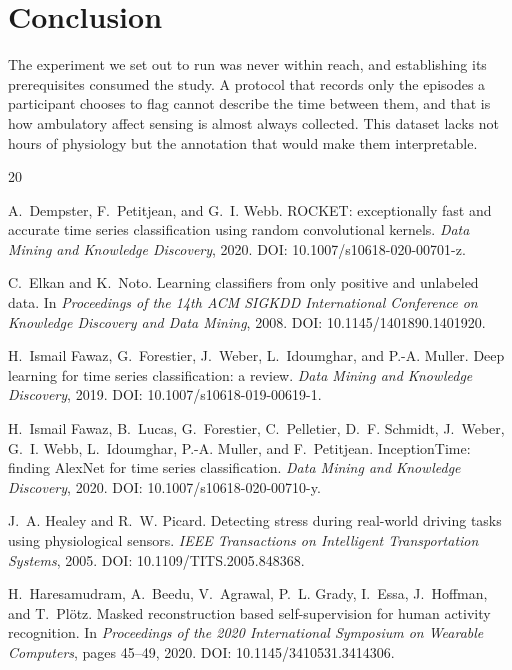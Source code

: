 \documentclass{article}
\begin{document}
\section{Conclusion}

The experiment we set out to run was never within reach, and establishing its
prerequisites consumed the study. A protocol that records only the episodes a
participant chooses to flag cannot describe the time between them, and that is
how ambulatory affect sensing is almost always collected. This dataset lacks not hours
of physiology but the annotation that would make them interpretable.

\begin{thebibliography}{20}

A.~Dempster, F.~Petitjean, and G.~I. Webb.
\newblock ROCKET: exceptionally fast and accurate time series classification
  using random convolutional kernels.
\newblock \emph{Data Mining and Knowledge Discovery}, 2020.
\newblock DOI: 10.1007/s10618-020-00701-z.

C.~Elkan and K.~Noto.
\newblock Learning classifiers from only positive and unlabeled data.
\newblock In \emph{Proceedings of the 14th ACM SIGKDD International Conference
  on Knowledge Discovery and Data Mining}, 2008.
\newblock DOI: 10.1145/1401890.1401920.

H.~Ismail Fawaz, G.~Forestier, J.~Weber, L.~Idoumghar, and P.-A. Muller.
\newblock Deep learning for time series classification: a review.
\newblock \emph{Data Mining and Knowledge Discovery}, 2019.
\newblock DOI: 10.1007/s10618-019-00619-1.

H.~Ismail Fawaz, B.~Lucas, G.~Forestier, C.~Pelletier, D.~F. Schmidt,
  J.~Weber, G.~I. Webb, L.~Idoumghar, P.-A. Muller, and F.~Petitjean.
\newblock InceptionTime: finding AlexNet for time series classification.
\newblock \emph{Data Mining and Knowledge Discovery}, 2020.
\newblock DOI: 10.1007/s10618-020-00710-y.

J.~A. Healey and R.~W. Picard.
\newblock Detecting stress during real-world driving tasks using physiological
  sensors.
\newblock \emph{IEEE Transactions on Intelligent Transportation Systems}, 2005.
\newblock DOI: 10.1109/TITS.2005.848368.

H.~Haresamudram, A.~Beedu, V.~Agrawal, P.~L. Grady, I.~Essa,
  J.~Hoffman, and T.~Pl\"otz.
\newblock Masked reconstruction based self-supervision for human
  activity recognition.
\newblock In \emph{Proceedings of the 2020 International Symposium on
  Wearable Computers}, pages 45--49, 2020.
\newblock DOI: 10.1145/3410531.3414306.


\end{thebibliography}
\end{document}
